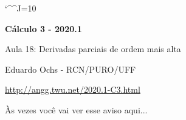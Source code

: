 \documentclass[oneside,12pt]{article}
\begin{document}
\catcode`\^^J=10

\long{}
\long{}
\long{}
\long{}
\long{}
\long{}
\long{}
\long{}
\long{}
\long{}

\long{}
\long{}

\def\frown{\ensuremath{{=}{(}}}
\def\True {\mathbf{V}}
\def\False{\mathbf{F}}

\def\drafturl{http://angg.twu.net/LATEX/2020-1-C2.pdf}
\def\drafturl{http://angg.twu.net/2020.1-C2.html}
\def\draftfooter{\tiny \href{\drafturl}{\jobname{}} \ColorBrown{\shorttoday{} \hours}}


%

\thispagestyle{empty}

\begin{center}

\vspace*{1.2cm}

{\bf \Large Cálculo 3 - 2020.1}

\bsk

Aula 18: Derivadas parciais de ordem mais alta

\bsk

Eduardo Ochs - RCN/PURO/UFF

\url{http://angg.twu.net/2020.1-C3.html}

\end{center}

\newpage


Às vezes você vai ver esse aviso aqui...

\ssk
\end{document}
